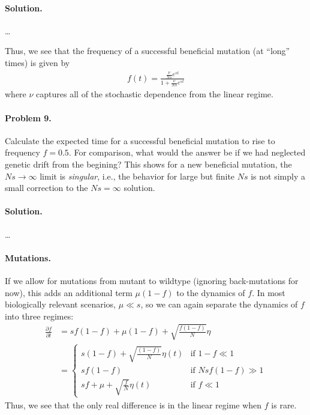 \documentclass[11pt]{article}
\begin{document}
\paragraph{Solution.} \ldots

\noindent Thus, we see that the frequency of a successful beneficial mutation (at ``long'' times) is given by
\begin{align}
f(t) = \frac{\frac{\nu}{Ns} e^{st}}{1+\frac{\nu}{Ns} e^{st}}
\end{align}
where $\nu$ captures all of the stochastic dependence from the linear regime. 

\paragraph{Problem 9.} Calculate the expected time for a successful beneficial mutation to rise to frequency $f=0.5$. For comparison, what would the answer be if we had neglected genetic drift from the begining? This shows for a new beneficial mutation, the $Ns \to \infty$ limit is \emph{singular}, i.e., the behavior for large but finite $Ns$ is not simply a small correction to the $Ns = \infty$ solution.  

\paragraph{Solution.} \ldots

\paragraph{Mutations.} If we allow for mutations from mutant to wildtype (ignoring back-mutations for now), this adds an additional term $\mu(1-f)$ to the dynamics of $f$. In most biologically relevant scenarios, $\mu \ll s$, so we can again separate the dynamics of $f$ into three regimes:
\begin{align}
\frac{\partial f}{\partial t} & = s f(1-f) + \mu(1-f) + \sqrt{\frac{f(1-f)}{N}} \eta \\
	& = \begin{cases} 
	s(1-f)+\sqrt{\frac{(1-f)}{N}} \eta(t) & \text{if $1-f \ll 1$} \\
	sf(1-f) & \text{if $Ns f(1-f) \gg 1$} \\
	sf+\mu+\sqrt{\frac{f}{N}} \eta(t) & \text{if $f \ll 1$}
	\end{cases}
\end{align}
Thus, we see that the only real difference is in the linear regime when $f$ is rare. 
\end{document}
